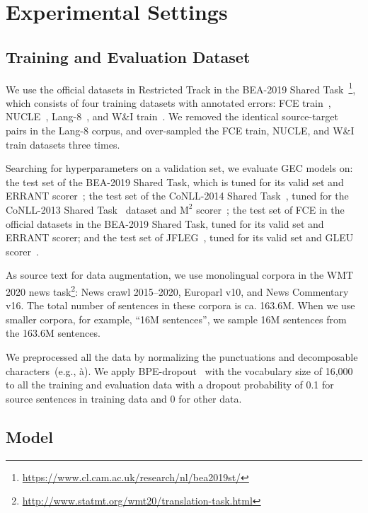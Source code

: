 \documentclass[11pt]{article}
\begin{document}
\section{Experimental Settings}

\subsection{Training and Evaluation Dataset}

We use the official datasets in Restricted Track in the BEA-2019 Shared Task~\citep{bryant-etal-2019-bea}\footnote{\url{https://www.cl.cam.ac.uk/research/nl/bea2019st/}},
which consists of four training datasets with annotated errors:
FCE train~\citep{yannakoudakis-etal-2011-new}, NUCLE~\citep{dahlmeier-etal-2013-building}, Lang-8~\citep{mizumoto-etal-2012-effect}, and W\&I train~\citep{bryant-etal-2019-bea}.
We removed the identical source-target pairs in the Lang-8 corpus, and over-sampled the FCE train, NUCLE, and W\&I train datasets three times.

Searching for hyperparameters on a validation set, we evaluate GEC models on:
the test set of the BEA-2019 Shared Task, which is tuned for its valid set and ERRANT scorer~\citep{bryant-etal-2017-automatic};
the test set of the CoNLL-2014 Shared Task~\citep{ng-etal-2014-conll},
tuned for the CoNLL-2013 Shared Task~\citep{ng-etal-2013-conll} dataset and $\text{M}^2$ scorer~\citep{dahlmeier-ng-2012-better};
the test set of FCE in the official datasets in the BEA-2019 Shared Task, tuned for its valid set and ERRANT scorer;
and the test set of JFLEG~\citep{napoles-etal-2017-jfleg}, tuned for its valid set and GLEU scorer~\citep{napoles-etal-2015-ground}.

As source text for data augmentation, we use monolingual corpora in the WMT 2020 news task\footnote{\url{http://www.statmt.org/wmt20/translation-task.html}}:
News crawl 2015--2020, Europarl v10, and News Commentary v16.
The total number of sentences in these corpora is ca. 163.6M.
When we use smaller corpora, for example, ``16M sentences'', we sample 16M sentences from the 163.6M sentences.

We preprocessed all the data by normalizing the punctuations and decomposable characters~(e.g., à).
We apply BPE-dropout~\citep{provilkov-etal-2020-bpe} with the vocabulary size of 16,000 to all the training and evaluation data
with a dropout probability of 0.1 for source sentences in training data and 0 for other data.

\subsection{Model}
\end{document}
